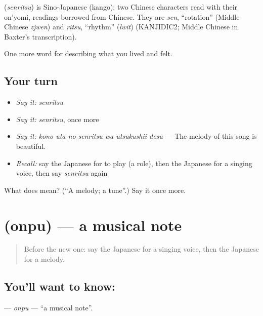 \begin{cousinweb}
\textbf{} (\emph{senritsu}) is Sino-Japanese (kango): two Chinese characters read with their on'yomi, readings borrowed from Chinese. They are \emph{sen}, \textquotedblleft{}rotation\textquotedblright{} (Middle Chinese \emph{zjwen}) and \emph{ritsu}, \textquotedblleft{}rhythm\textquotedblright{} (\emph{lwit}) (KANJIDIC2; Middle Chinese in Baxter's transcription).
\end{cousinweb}

\begin{grammarlens}[title={What you've built}]
One more word for describing what you lived and felt.
\end{grammarlens}

\subsection*{Your turn}
\begin{itemize}
\raggedright
  \item \emph{Say it:} \emph{senritsu}
  \item \emph{Say it:} \emph{senritsu}, once more
  \item \emph{Say it:} \emph{kono uta no senritsu wa utsukushii desu} — The melody of this song is beautiful.
  \item \emph{Recall:} say the Japanese for to play (a role), then the Japanese for a singing voice, then say \emph{senritsu} again
\end{itemize}

\begin{tcolorbox}[breakable,colback=teal!4,colframe=teal!35!black,title={Before you move on}]
What does  mean? (\textquotedblleft{}A melody; a tune\textquotedblright{}.) Say it once more.
\end{tcolorbox}
\section[\texorpdfstring{\ja{おんぷ} (onpu)}{おんぷ (onpu)}]{ (onpu) — a musical note}

\label{lesson:JA-C503-onpu}



\begin{quote}
Before the new one: say the Japanese for a singing voice, then the Japanese for a melody.
\end{quote}

\subsection*{You'll want to know: }
\textbf{} — \emph{onpu} — \textquotedblleft{}a musical note\textquotedblright{}.

